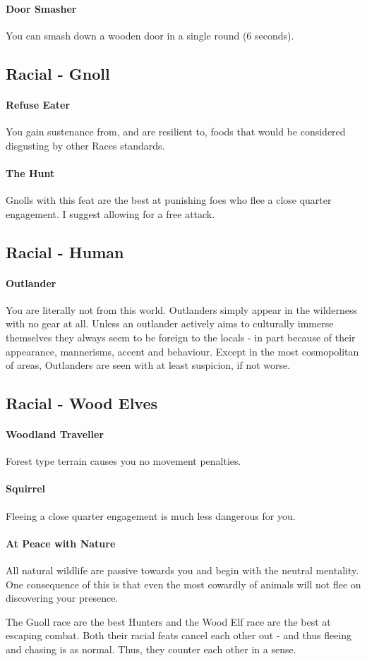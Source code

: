     \paragraph{Door Smasher} You can smash down a wooden door in a single round (6 seconds). 
\subsection{Racial - Gnoll}
    \paragraph{Refuse Eater} You gain sustenance from, and are resilient to, foods that would be considered disgusting by other Races standards. 
    \paragraph{The Hunt} Gnolls with this feat are the best at punishing foes who flee a close quarter engagement. I suggest allowing for a free attack.    
\subsection{Racial - Human}
    \paragraph{Outlander} You are literally not from this world. Outlanders simply appear in the wilderness with no gear at all. Unless an outlander actively aims to culturally immerse themselves they always seem to be foreign to the locals - in part because of their appearance, mannerisms, accent and behaviour. Except in the most cosmopolitan of areas, Outlanders are seen with at least suspicion, if not worse.
\subsection{Racial - Wood Elves}
    \paragraph{Woodland Traveller} Forest type terrain causes you no movement penalties.
    \paragraph{Squirrel} Fleeing a close quarter engagement is much less dangerous for you.
    \paragraph{At Peace with Nature} All natural wildlife are passive towards you and begin with the neutral mentality. One consequence of this is that even the most cowardly of animals will not flee on discovering your presence. 
    \begin{framed}\centering
        The Gnoll race are the best Hunters and the Wood Elf race are the best at escaping combat. Both their racial feats cancel each other out - and thus fleeing and chasing is as normal. Thus, they counter each other in a sense.          
    \end{framed}
